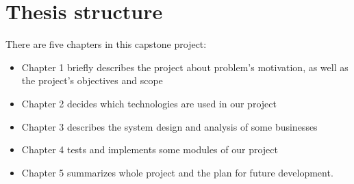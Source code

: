 \section{Thesis structure}
There are five chapters in this capstone project:
\begin{itemize}
    \item Chapter 1 briefly describes the project about problem’s motivation, as well as the project’s objectives and scope
    \item Chapter 2 decides which technologies are used in our project
    \item Chapter 3 describes the system design and analysis of some businesses
    \item Chapter 4 tests and implements some modules of our project
    \item Chapter 5 summarizes whole project and the plan for future development.
\end{itemize}